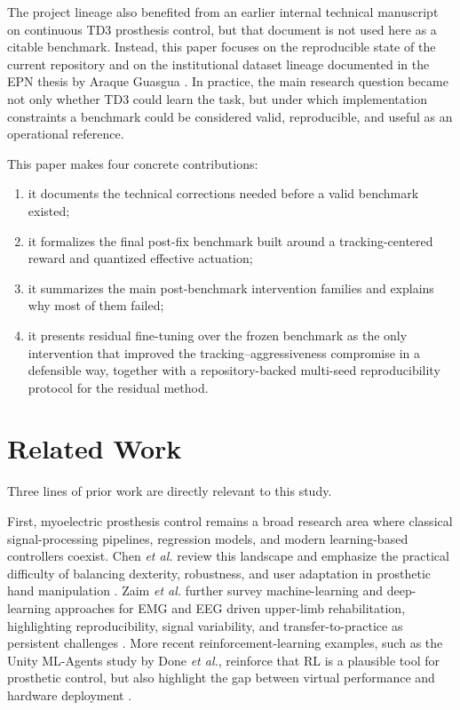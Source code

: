 \documentclass[conference]{IEEEtran}
\begin{document}
The project lineage also benefited from an earlier internal technical manuscript on continuous TD3 prosthesis control, but that document is not used here as a citable benchmark. Instead, this paper focuses on the reproducible state of the current repository and on the institutional dataset lineage documented in the EPN thesis by Araque Guasgua \cite{araque2024thesis}. In practice, the main research question became not only whether TD3 could learn the task, but under which implementation constraints a benchmark could be considered valid, reproducible, and useful as an operational reference.

This paper makes four concrete contributions:
\begin{enumerate}
    \item it documents the technical corrections needed before a valid benchmark existed;
    \item it formalizes the final post-fix benchmark built around a tracking-centered reward and quantized effective actuation;
    \item it summarizes the main post-benchmark intervention families and explains why most of them failed;
    \item it presents residual fine-tuning over the frozen benchmark as the only intervention that improved the tracking--aggressiveness compromise in a defensible way, together with a repository-backed multi-seed reproducibility protocol for the residual method.
\end{enumerate}

\section{Related Work}
Three lines of prior work are directly relevant to this study.

First, myoelectric prosthesis control remains a broad research area where classical signal-processing pipelines, regression models, and modern learning-based controllers coexist. Chen \emph{et al.} review this landscape and emphasize the practical difficulty of balancing dexterity, robustness, and user adaptation in prosthetic hand manipulation \cite{chen2023review}. Zaim \emph{et al.} further survey machine-learning and deep-learning approaches for EMG and EEG driven upper-limb rehabilitation, highlighting reproducibility, signal variability, and transfer-to-practice as persistent challenges \cite{zaim2025systematic}. More recent reinforcement-learning examples, such as the Unity ML-Agents study by Done \emph{et al.}, reinforce that RL is a plausible tool for prosthetic control, but also highlight the gap between virtual performance and hardware deployment \cite{done2025prostheticrl}.
\end{document}

